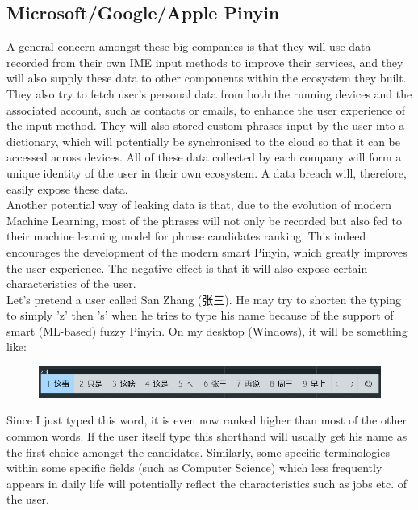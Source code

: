 \documentclass[12pt]{article}
\begin{document}
\subsection{Microsoft/Google/Apple Pinyin}

A general concern amongst these big companies is that they will use data recorded from their own IME input methods to improve their services, and they will also supply these data to other components within the ecosystem they built. They also try to fetch user's personal data from both the running devices and the associated account, such as contacts or emails, to enhance the user experience of the input method. They will also stored custom phrases input by the user into a dictionary, which will potentially be synchronised to the cloud so that it can be accessed across devices. All of these data collected by each company will form a unique identity of the user in their own ecosystem. A data breach will, therefore, easily expose these data. \\

Another potential way of leaking data is that, due to the evolution of modern Machine Learning, most of the phrases will not only be recorded but also fed to their machine learning model for phrase candidates ranking. This indeed encourages the development of the modern smart Pinyin, which greatly improves the user experience. The negative effect is that it will also expose certain characteristics of the user. \\

Let's pretend a user called San Zhang (张三). He may try to shorten the typing to simply 'z' then 's' when he tries to type his name because of the support of smart (ML-based) fuzzy Pinyin. On my desktop (Windows), it will be something like:

\begin{figure}[H]
  \centering
  \includegraphics[scale=0.6]{zs.png}
\end{figure}

Since I just typed this word, it is even now ranked higher than most of the other common words. If the user itself type this shorthand will usually get his name as the first choice amongst the candidates. Similarly, some specific terminologies within some specific fields (such as Computer Science) which less frequently appears in daily life will potentially reflect the characteristics such as jobs etc. of the user.
\end{document}
